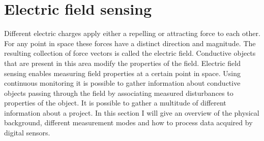 \section{Electric field sensing}
Different electric charges apply either a repelling or attracting force to each other. For any point in space these forces have a distinct direction and magnitude. The resulting collection of force vectors is called the electric field. Conductive objects that are present in this area modify the properties of the field. Electric field sensing enables measuring field properties at a certain point in space. Using continuous monitoring it is possible to gather information about conductive objects passing through the field by associating measured disturbances to properties of the object. It is possible to gather a multitude of different information about a project. In this section I will give an overview of the physical background, different measurement modes and how to process data acquired by digital sensors.
